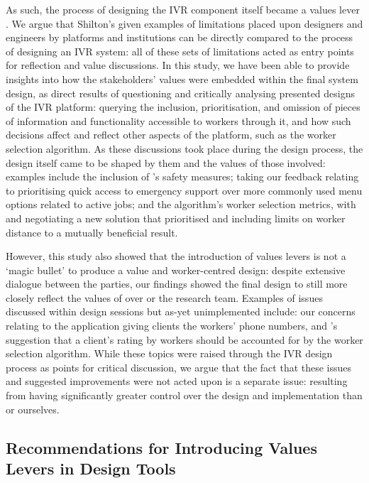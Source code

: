 As such, the process of designing the IVR component itself became a values lever \cite{Shilton2013}. We argue that Shilton's given examples of limitations placed upon designers and engineers by platforms and institutions \cite{shilton2018, shilton2019} can be directly compared to the process of designing an IVR system: all of these sets of limitations acted as entry points for reflection and value discussions. In this study, we have been able to provide insights into how the stakeholders' values were embedded within the final system design, as direct results of questioning and critically analysing presented designs of the IVR platform: querying the inclusion, prioritisation, and omission of pieces of information and functionality accessible to workers through it, and how such decisions affect and reflect other aspects of the platform, such as the worker selection algorithm. As these discussions took place during the design process, the design itself came to be shaped by them and the values of those involved: examples include the inclusion of \NGO{}'s safety measures; \PC{} taking our feedback relating to prioritising quick access to emergency support over more commonly used menu options related to active jobs; and the algorithm's worker selection metrics, with \NGO{} and \PC{} negotiating a new solution that prioritised and including limits on worker distance to a mutually beneficial result.

However, this study also showed that the introduction of values levers is not a `magic bullet' to produce a value and worker-centred design: despite extensive dialogue between the parties, our findings showed the final design to still more closely reflect the values of \PC{} over \NGO{} or the research team. Examples of issues discussed within design sessions but as-yet unimplemented include: our concerns relating to the application giving clients the workers' phone numbers, and \NGO{}'s suggestion that a client's rating by workers should be accounted for by the worker selection algorithm. While these topics were raised through the IVR design process as points for critical discussion, we argue that the fact that these issues and suggested improvements were not acted upon is a separate issue: resulting from \PC{} having significantly greater control over the design and implementation than \NGO{} or ourselves. 

\subsection{Recommendations for Introducing Values Levers in Design Tools}

